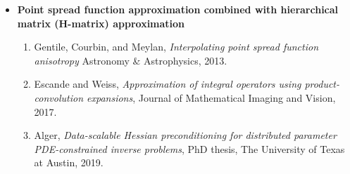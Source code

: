 \documentclass[10pt,final,xcolor=dvipsnames]{beamer}
\begin{document}
\begin{frame}
\begin{itemize}
\begin{enumerate}
{      Likelihood Estimation using Hierarchical Matrices}, JUQ, 2023.
    \end{enumerate}
    \vspace{-0.02in}
  \item {\bf Point spread function approximation combined with
    hierarchical matrix (H-matrix) approximation}
    \vspace{0.02in}
    \begin{enumerate}
      \scriptsize
    \item Gentile, Courbin, and Meylan, {\it Interpolating point
      spread function anisotropy} Astronomy \& Astrophysics, 2013.
    \item Escande and Weiss, {\it Approximation of integral operators using product-convolution
expansions}, Journal of Mathematical Imaging and Vision, 2017.
    \item Alger, {\it Data-scalable Hessian preconditioning for
      distributed parameter PDE-constrained inverse problems}, PhD
      thesis, The University of Texas at Austin, 2019.
    \end{enumerate}
  \end{itemize}
\end{frame}
\end{document}
